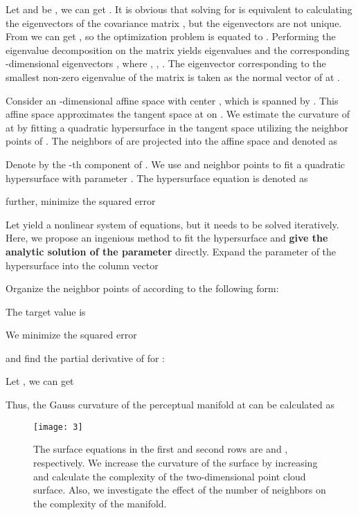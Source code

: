 \documentclass[10pt,twocolumn,letterpaper]{article}
\begin{document}
Let  and  be , we can get . It is obvious that solving for  is equivalent to calculating the eigenvectors of the covariance matrix , but the eigenvectors are not unique. From  we can get , so the optimization problem is equated to . Performing the eigenvalue decomposition on the matrix  yields  eigenvalues  and the corresponding -dimensional eigenvectors , where , , . The eigenvector  corresponding to the smallest non-zero eigenvalue of the matrix  is taken as the normal vector  of  at . 

Consider an -dimensional affine space with center , which is spanned by . This affine space approximates the tangent space at  on . We estimate the curvature of  at  by fitting a quadratic hypersurface in the tangent space utilizing the neighbor points of . The  neighbors of  are projected into the affine space  and denoted as 
\begin{small}

\end{small}
Denote by  the -th component  of . We use  and  neighbor points to fit a quadratic hypersurface  with parameter . The hypersurface equation is denoted as

further, minimize the squared error

Let  yield a nonlinear system of equations, but it needs to be solved iteratively. Here, we propose an ingenious method to fit the hypersurface and \textbf{give the analytic solution of the parameter } directly. Expand the parameter  of the hypersurface into the column vector

Organize the  neighbor points  of  according to the following form:
\begin{scriptsize}

\end{scriptsize}
The target value is
\begin{small}

\end{small}
We minimize the squared error

and find the partial derivative of  for :
\begin{small}

\end{small}
Let , we can get

Thus, the Gauss curvature of the perceptual manifold  at  can be calculated as



\begin{figure}[t]
\centering
\centerline{\texttt{[image: 3]}}
\vskip -0.05in
\caption{The surface equations in the first and second rows are  and , respectively. We increase the curvature of the surface by increasing  and calculate the complexity of the two-dimensional point cloud surface. Also, we investigate the effect of the number of neighbors  on the complexity of the manifold.}
\label{fig3}
\vskip -0.1in
\end{figure}
\end{document}
